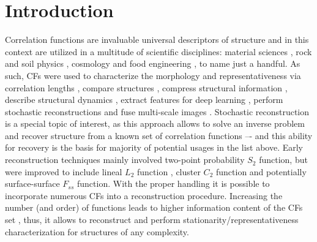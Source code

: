 \documentclass[reprint,amsmath,amssymb,aps,pre,showkeys,showpacs]{revtex4-1}
\begin{document}
\section{Introduction}
\label{sec:intro}
Correlation functions are invaluable universal descriptors of structure
and in this context are utilized in a multitude of scientific disciplines:
material sciences \cite{Cecen,chen2022quantifying}, rock
\cite{ledesma2018effect} and soil physics
\cite{Euras2012,PLoS_ONE,KarsaninaEJSS}, cosmology \cite{TakadaJain} and food
engineering \cite{Derossi2019}, to name just a handful. As such, CFs were used
to characterize the morphology \cite{tensorPRE} and representativeness via
correlation lengths \cite{vcapek2011transport,thovert2011grain}, compare
structures \cite{jiao2014chawla,EPL1,REVpaper}, compress structural information
\cite{SciRep1,Havelka,KarsaninaEJSS}, describe structural dynamics
\cite{chen2015dynamic,PLoS_ONE,xu2022correlation}, extract features for deep
learning \cite{Miao2017,kamrava2020linking,roding2020predicting,KarsaninaEJSS},
perform stochastic reconstructions
\cite{Adler_recon,Y-T,EPL2,tahmasebiPRL,karsaninaPRL} and fuse multi-scale
images \cite{SciRep1,chen2016stochastic,Geoderma2018}. Stochastic reconstruction
is a special topic of interest, as this approach allows to solve an inverse
problem and recover structure from a known set of correlation functions –- and
this ability for recovery is the basis for majority of potential usages in the
list above. Early reconstruction techniques mainly involved two-point
probability $S_2$ function, but were improved to include lineal $L_2$ function
\cite{Y-T,vcapek2009stochastic,vcapek2011transport}, cluster $C_2$ function
\cite{JiaoPNAS,jiao2014chawla} and potentially surface-surface $F_{ss}$
function. With the proper handling \cite{EPL2} it is possible to incorporate
numerous CFs into a reconstruction procedure. Increasing the number (and order)
of functions leads to higher information content of the CFs set
\cite{Gommes1,Gommes2}, thus, it allows to reconstruct and perform
stationarity/representativeness characterization \cite{REVpaper} for structures
of any complexity.
\end{document}
